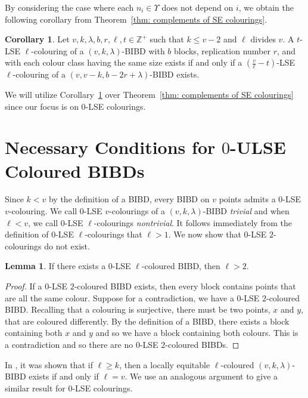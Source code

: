 \documentclass[12pt]{article}
\theoremstyle{definition}
\newtheorem{lemma}[theorem]{Lemma}
\newtheorem{corollary}[theorem]{Corollary}
\newcommand{\deviations}{\Upsilon}
\begin{document}
By considering the case where each $n_i \in \deviations$ does not depend on $i$, we obtain the following corollary from Theorem~\ref{thm: complements of SE colourings}. 

\begin{corollary}\label{cor: complements of t-LSE colourings}
    Let $v,k,\lambda, b, r, \ell, t\in \mathbb{Z}^+$ such that $k\leq v-2$ and $\ell$ divides $v$. A $t$-LSE $\ell$-colouring of a $(v,k,\lambda)$-BIBD with $b$ blocks, replication number $r$, and with each colour class having the same size exists if and only if a $(\frac{v}{\ell}-t)$-LSE $\ell$-colouring of a $(v, v-k, b-2r+\lambda)$-BIBD exists.
\end{corollary}

We will utilize Corollary~\ref{cor: complements of t-LSE colourings} over Theorem~\ref{thm: complements of SE colourings} since our focus is on $0$-LSE colourings.



\section{Necessary Conditions for \texorpdfstring{$0$}{0}-ULSE Coloured BIBDs}\label{sec: Necessary Conditions}

Since $k < v$ by the definition of a BIBD, every BIBD on $v$ points admits a $0$-LSE $v$-colouring. We call $0$-LSE $v$-colourings of a $(v,k,\lambda)$-BIBD \emph{trivial} and when $\ell < v$, we call $0$-LSE $\ell$-colourings \emph{nontrivial}. It follows immediately from the definition of $0$-LSE $\ell$-colourings that $\ell > 1$. We now show that $0$-LSE $2$-colourings do not exist. 

\begin{lemma}
    If there exists a $0$-LSE $\ell$-coloured BIBD, then $\ell > 2$.
\end{lemma}

\begin{proof}
    If a $0$-LSE $2$-coloured BIBD exists, then every block contains points that are all the same colour. Suppose for a contradiction, we have a $0$-LSE $2$-coloured BIBD. Recalling that a colouring is surjective, there must be two points, $x$ and $y$, that are coloured differently. By the definition of a BIBD, there exists a block containing both $x$ and $y$ and so we have a block containing both colours. This is a contradiction and so there are no $0$-LSE $2$-coloured BIBDs. 
\end{proof}

In \cite{L16, LP16}, it was shown that if $\ell \geq k$, then a locally equitable $\ell$-coloured $(v,k,\lambda)$-BIBD exists if and only if $\ell = v$. We use an analogous argument to give a similar result for $0$-LSE colourings. 
\end{document}
